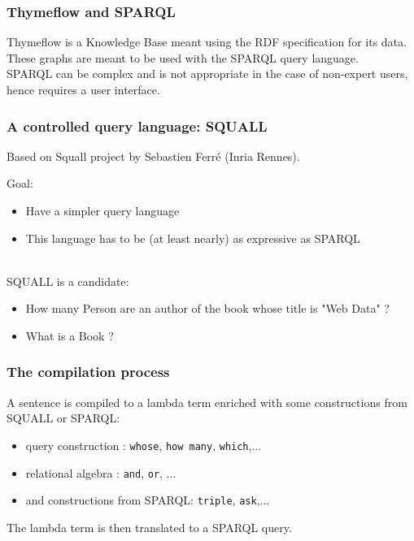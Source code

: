 \documentclass{beamer}
\begin{document}
	\begin{frame}
		\frametitle{Thymeflow and SPARQL}
    Thymeflow is a Knowledge Base meant using the RDF specification for its data.
    ~\\
    These graphs are meant to be used with the SPARQL query language.
    \lstA
    ~\\
    SPARQL can be complex and is not appropriate in the case of non-expert users, hence requires a user interface.
	\end{frame}
  \begin{frame}
    \frametitle{A controlled query language: SQUALL}
    Based on Squall project by Sebastien Ferré (Inria Rennes).

    Goal:
    \begin{itemize}
      \item Have a simpler query language
      \item This language has to be (at least nearly) as expressive as SPARQL
    \end{itemize}
    ~\\
    SQUALL is a candidate:
    \begin{itemize}
      \item How many Person are an author of the book whose title is "Web Data" ?
      \item What is a Book ?
    \end{itemize}
  \end{frame}
  \begin{frame}
    \frametitle{The compilation process}
    A sentence is compiled to a lambda term enriched with
    some constructions from SQUALL or SPARQL:
    \begin{itemize}
      \item query construction : \texttt{whose}, \texttt{how many}, \texttt{which},...
      \item relational algebra : \texttt{and}, \texttt{or}, ...
      \item and constructions from SPARQL: \texttt{triple}, \texttt{ask},...
    \end{itemize}

    The lambda term is then translated to a SPARQL query.

  \end{frame}
\end{document}
